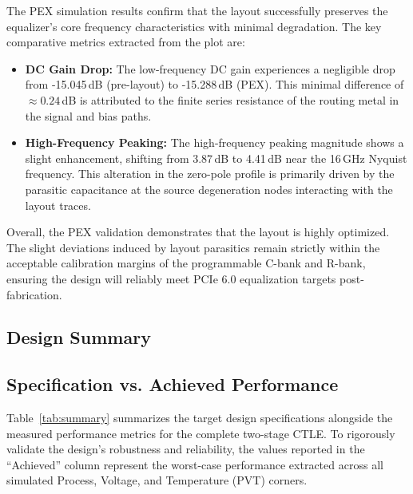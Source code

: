 \newpage
The PEX simulation results confirm that the layout successfully preserves the equalizer's core frequency characteristics with minimal degradation. The key comparative metrics extracted from the plot are:
\begin{itemize}[noitemsep]
    \item \textbf{DC Gain Drop:} The low-frequency DC gain experiences a negligible drop from -15.045\,dB (pre-layout) to -15.288\,dB (PEX). This minimal difference of $\approx 0.24$\,dB is attributed to the finite series resistance of the routing metal in the signal and bias paths.
    \item \textbf{High-Frequency Peaking:} The high-frequency peaking magnitude shows a slight enhancement, shifting from 3.87\,dB to 4.41\,dB near the 16\,GHz Nyquist frequency. This alteration in the zero-pole profile is primarily driven by the parasitic capacitance at the source degeneration nodes interacting with the layout traces.
\end{itemize}

Overall, the PEX validation demonstrates that the layout is highly optimized. The slight deviations induced by layout parasitics remain strictly within the acceptable calibration margins of the programmable C-bank and R-bank, ensuring the design will reliably meet PCIe 6.0 equalization targets post-fabrication.



\newpage
\subsection{Design Summary}
\label{sec:summary}

\subsection*{Specification vs. Achieved Performance}

Table~\ref{tab:summary} summarizes the target design specifications alongside the measured performance metrics for the complete two-stage CTLE. To rigorously validate the design's robustness and reliability, the values reported in the ``Achieved'' column represent the worst-case performance extracted across all simulated Process, Voltage, and Temperature (PVT) corners. 


